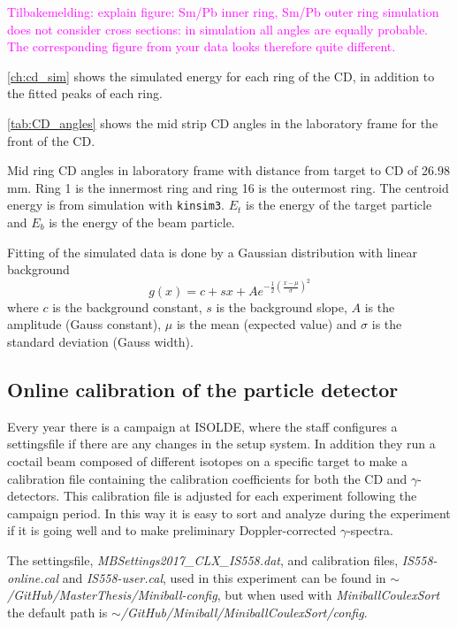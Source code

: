 \documentclass[twoside,english]{uiofysmaster/uiofysmaster}
\newcommand{\ga}{$\gamma$}
\begin{document}
\textcolor{Magenta}{Tilbakemelding: \newline 
explain figure: Sm/Pb inner ring, Sm/Pb outer ring \newline
simulation does not consider cross sections: in simulation all angles are equally probable. The corresponding figure from your data looks therefore quite different.
}


\autoref{ch:cd_sim} shows the simulated energy for each ring of the CD, in addition to the fitted peaks of each ring.


\autoref{tab:CD_angles} shows the mid strip CD angles in the laboratory frame for the front of the CD. 

\begin{table}[ht] 
    \centering 
    \caption{Mid ring CD angles in laboratory frame with distance from target to CD of 26.98 mm. Ring 1 is the innermost ring and ring 16 is the outermost ring. The centroid energy is from simulation with \texttt{kinsim3}. $E_t$ is the energy of the target particle and $E_b$ is the energy of the beam particle.}
	
	\label{tab:CD_angles}
\end{table}


Fitting of the simulated data is done by a Gaussian distribution with linear background
\begin{equation}
	g(x) = c + sx + A e^{-\frac{1}{2}\left(\frac{x - \mu}{\sigma}\right)^2}
\end{equation}
where $c$ is the background constant, $s$ is the background slope, $A$ is the amplitude (Gauss constant), $\mu$ is the mean (expected value) and $\sigma$ is the standard deviation (Gauss width).



\subsection{Online calibration of the particle detector}
Every year there is a campaign at ISOLDE, where the staff configures a settingsfile if there are any changes in the setup system. In addition they run a coctail beam composed of different isotopes on a specific target to make a calibration file containing the calibration coefficients for both the CD and \ga-detectors. This calibration file is adjusted for each experiment following the campaign period. In this way it is easy to sort and analyze during the experiment if it is going well and to make preliminary Doppler-corrected \ga-spectra. 

The settingsfile, \textit{MBSettings2017\_CLX\_IS558.dat}, and calibration files, \textit{IS558-online.cal} and \textit{IS558-user.cal}, used in this experiment can be found in \newline \textit{$\sim$/GitHub/MasterThesis/Miniball-config}, but when used with \textsl{MiniballCoulexSort} the default path is \textit{$\sim$/GitHub/Miniball/MiniballCoulexSort/config}.
\end{document}
